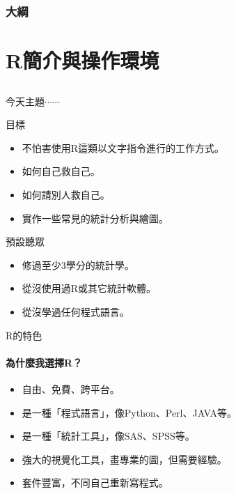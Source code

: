 \documentclass[12pt, aspectratio=43]{beamer}
\begin{document}
\begin{frame}
\titlepage
\end{frame}

\begin{frame}
\frametitle{大綱}
\tableofcontents
\end{frame}

\section{R簡介與操作環境}\subsection{}

\begin{frame}{今天主題$\cdots\cdots$}

\begin{block}{目標}
\begin{itemize}
\item 不怕害使用R這類以文字指令進行的工作方式。
\item 如何自己救自己。
\item 如何請別人救自己。
\item 實作一些常見的統計分析與繪圖。
\end{itemize}
\end{block}

\begin{block}{預設聽眾}
\begin{itemize}
\item 修過至少3學分的統計學。
\item 從沒使用過R或其它統計軟體。
\item 從沒學過任何程式語言。
\end{itemize}
\end{block}

\end{frame}




\begin{frame}{R的特色}
\framesubtitle{為什麼我選擇R？}
\begin{itemize}
\item 自由、免費、跨平台。
\item 是一種「程式語言」，像Python、Perl、JAVA等。
\item 是一種「統計工具」，像SAS、SPSS等。
\item 強大的視覺化工具，畫專業的圖，但需要經驗。
\item 套件豐富，不同自己重新寫程式。
\end{itemize}
\end{frame}
\end{document}
